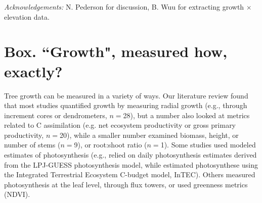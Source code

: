 \documentclass[11pt]{article}
\begin{document}

\emph{Acknowledgements:} N. Pederson for discussion, B. Wuu for extracting growth $\times$ elevation data. 

\newpage
\section{Box. ``Growth", measured how, exactly?}
Tree growth can be measured in a variety of ways. Our literature review found that most studies quantified growth by measuring radial growth (e.g., through increment cores or dendrometers, $n=$28), but a number also looked at metrics related to C assimilation (e.g. net ecosystem productivity or gross primary productivity, $n=$20), while a smaller number examined biomass, height, or number of stems ($n=$9), or root:shoot ratio ($n=$1). Some studies used modeled estimates of photosynthesis 
(e.g., \citet{smith2014implications} relied on daily photosynthesis estimates derived from the LPJ-GUESS photosynthesis model, while \citet{chen2000approaches} estimated photosynthese using the Integrated Terrestrial Ecosystem C-budget model, InTEC). Others measured photosynthesis at the leaf level, through flux towers, or used greenness metrics (NDVI). 
\end{document}

